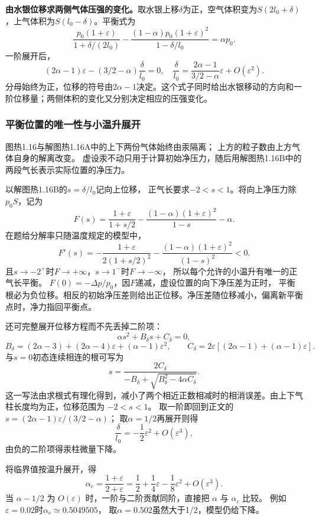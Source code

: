 \documentclass[UTF8,fontset=fandol,a4paper,11pt]{ctexart}
\begin{document}
\textbf{由水银位移求两侧气体压强的变化。}取水银上移$\delta$为正，空气体积变为$S(2l_0+\delta)$，上气体积为$S(l_0-\delta)$。平衡式为
\[\frac{p_0(1+\varepsilon)}{1+\delta/(2l_0)}
-\frac{(1-\alpha)p_0(1+\varepsilon)^2}{1-\delta/l_0}
=\alpha p_0.\]
一阶展开后，
\[(2\alpha-1)\varepsilon-(3/2-\alpha)\frac{\delta}{l_0}=0,
\quad \frac{\delta}{l_0}=\frac{2\alpha-1}{3/2-\alpha}\varepsilon+O(\varepsilon^2).\]
分母始终为正，位移的符号由$2\alpha-1$决定。这个式子同时给出水银移动的方向和一阶位移量；两侧体积的变化又分别决定相应的压强变化。
\subsubsection*{平衡位置的唯一性与小温升展开}
图热1.16与解图热1.16A中的上下两份气体始终由汞隔离；
上方的粒子数由上方气体自身的解离改变。
虚设汞不动只用于计算初始净压力，随后用解图热1.16B中的两段气长表示实际位置的净压力。

以解图热1.16B的$s=\delta/l_0$记向上位移，
正气长要求$-2<s<1$。将向上净压力除$p_0S$，记为
\[
F(s)=\frac{1+\varepsilon}{1+s/2}
-\frac{(1-\alpha)(1+\varepsilon)^2}{1-s}-\alpha.
\]
在题给分解率只随温度规定的模型中，
\[
F'(s)=-\frac{1+\varepsilon}{2(1+s/2)^2}
-\frac{(1-\alpha)(1+\varepsilon)^2}{(1-s)^2}<0.
\]
且$s\to-2^+$时$F\to+\infty$，$s\to1^-$时$F\to-\infty$，
所以每个允许的小温升有唯一的正气长平衡。
$F(0)=-\Delta p/p_0$，因$F$递减，虚设位置的向下净压差为正时，
平衡根必为负位移。相反的初始净压差则给出正位移。净压差随位移减小，偏离新平衡点时，净力指回平衡点。

还可完整展开位移方程而不先丢掉二阶项：
\[
\alpha s^2+B_\delta s+C_\delta=0,
\]
\[
B_\delta=(2\alpha-3)+(2\alpha-4)\varepsilon
+(\alpha-1)\varepsilon^2,\qquad
C_\delta=2\varepsilon[(2\alpha-1)+(\alpha-1)\varepsilon].
\]
与$s=0$初态连续相连的根可写为
\[
s=\frac{2C_\delta}
{-B_\delta+\sqrt{B_\delta^2-4\alpha C_\delta}}.
\]
这一写法由求根式有理化得到，减小了两个相近正数相减时的相消误差。由上下气柱长度均为正，位移范围为 $-2<s<1$。
取一阶即回到正文的$s=(2\alpha-1)\varepsilon/(3/2-\alpha)$；
取$\alpha=1/2$再展开则得
\[
\frac{\delta}{l_0}=-\frac12\varepsilon^2+O(\varepsilon^3),
\]
由负的二阶项得汞柱微量下降。

将临界值按温升展开，得
\[
\alpha_c=\frac{1+\varepsilon}{2+\varepsilon}
=\frac12+\frac14\varepsilon-\frac18\varepsilon^2+O(\varepsilon^3).
\]
当 $\alpha-1/2$ 为 $O(\varepsilon)$ 时，一阶与二阶贡献同阶，直接把 $\alpha$ 与 $\alpha_c$ 比较。
例如$\varepsilon=0.02$时$\alpha_c\simeq0.5049505$，
取$\alpha=0.502$虽然大于1/2，模型仍给下降。
\end{document}
